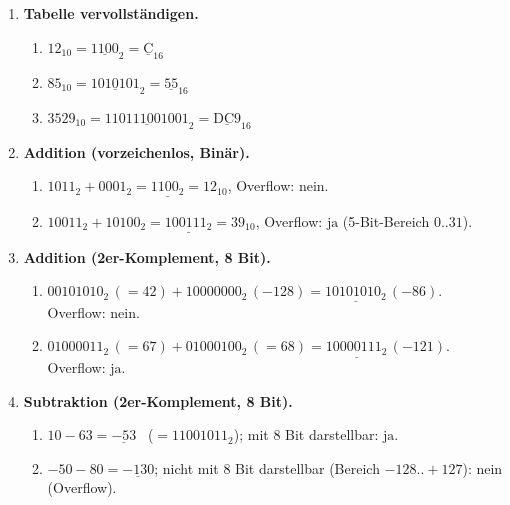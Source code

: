 \documentclass[11pt,a4paper]{scrartcl}
\begin{document}
	\begin{enumerate}[leftmargin=*,label=\textbf{Aufgabe~\arabic*:}, itemsep=0.9em, start=1]
		
		\item \textbf{Tabelle vervollständigen.}
		\begin{enumerate}[label*=\alph*)]
			\item \(12_{10} = \underline{1100}_2 = \underline{\mathrm{C}}_{16}\)
			\item \(85_{10} = \underline{1010101}_2 = \underline{\mathrm{55}}_{16}\)
			\item \(3529_{10} = \underline{110111001001}_2 = \underline{\mathrm{DC9}}_{16}\)
		\end{enumerate}
		
		\item \textbf{Addition (vorzeichenlos, Binär).}
		\begin{enumerate}[label*=\alph*)]
			\item \(1011_2 + 0001_2 = \underline{1100_2}=12_{10}\), Overflow: \(\boxed{\text{nein}}\).
			\item \(10011_2 + 10100_2 = \underline{100111_2}=39_{10}\), Overflow: \(\boxed{\text{ja}}\) (5-Bit-Bereich \(0..31\)).
		\end{enumerate}
		
		\item \textbf{Addition (2er-Komplement, 8 Bit).}
		\begin{enumerate}[label*=\alph*)]
			\item \(00101010_2\,(=42) + 10000000_2\,(-128) = \underline{10101010_2}\,(-86)\). Overflow: \(\boxed{\text{nein}}\).
			\item \(01000011_2\,(=67) + 01000100_2\,(=68) = \underline{10000111_2}\,(-121)\). Overflow: \(\boxed{\text{ja}}\).
		\end{enumerate}
		
		\item \textbf{Subtraktion (2er-Komplement, 8 Bit).}
		\begin{enumerate}[label*=\alph*)]
			\item \(10-63 = \underline{-53}\) \ (\(=11001011_2\)); mit 8 Bit darstellbar: \(\boxed{\text{ja}}\).
			\item \(-50-80 = \underline{-130}\); nicht mit 8 Bit darstellbar (Bereich \(-128..+127\)): \(\boxed{\text{nein}}\) (Overflow).
		\end{enumerate}
		

\end{enumerate}
\end{document}
